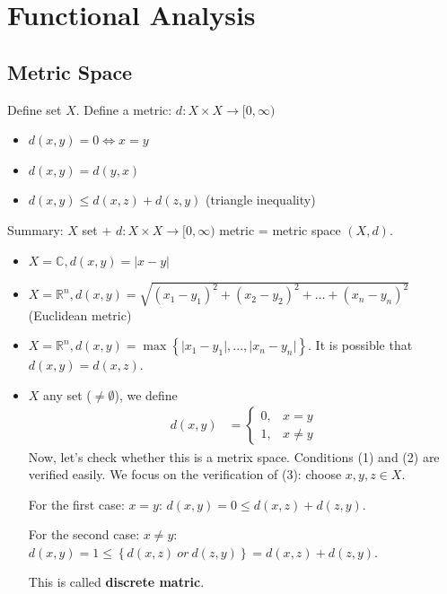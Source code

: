 \documentclass[../../note.tex]{subfiles}
\begin{document}
\chapter{Functional Analysis}
\section{Metric Space}
\begin{definition}
    Define set $X$. Define a metric: $d: X \times X \rightarrow [0, \infty)$ 
    \begin{itemize}
        \item $d(x, y) = 0 \Longleftrightarrow x = y$
        \item $d(x, y) = d(y,x)$
        \item $d(x,y) \leq d(x,z) + d(z,y)$ (triangle inequality)
    \end{itemize}
\end{definition}

Summary: $X$ set + $d: X \times X \rightarrow [0,\infty)$ metric = metric space $(X, d)$.
\begin{example}
    \begin{itemize}
        \item $X = \mathbb{C}, d(x,y) = \vert x-y \vert$
        \item $X = \mathbb{R}^n, d(x,y) = \sqrt{(x_1 - y_1)^2 +(x_2 - y_2)^2 +\dots+(x_n - y_n)^2 }$ (Euclidean metric)
        \item $X = \mathbb{R}^n, d(x,y) = \max\left\{\vert x_1 - y_1 \vert,..., \vert x_n - y_n \vert \right\}$. It is possible that $d(x,y) = d(x,z)$.
        \item $X$ any set ($\neq \emptyset$), we define
        \begin{align}
            d(x,y)
            &= \left\{ \begin{matrix}
                0,& x = y \\
                1,& x \neq y
            \end{matrix}\right.
        \end{align}
        Now, let's check whether this is a metrix space. Conditions (1) and (2) are verified easily. We focus on the verification of (3): choose $x,y,z \in X$. 
        
        For the first case: $x = y$: $d(x,y) = 0 \leq d(x,z) + d(z,y)$.

        For the second case: $x \neq y$: $d(x,y) = 1 \leq \left\{d(x,z)~or~d(z,y)\right\} = d(x,z) + d(z,y)$.

        This is called \textbf{discrete matric}.
    \end{itemize}
\end{example}
\end{document}

